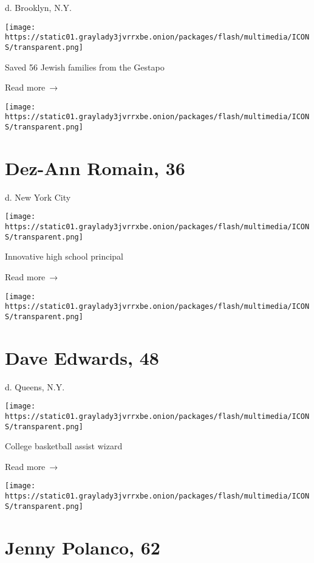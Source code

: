 d. Brooklyn, N.Y.

\texttt{[image: https://static01.graylady3jvrrxbe.onion/packages/flash/multimedia/ICONS/transparent.png]}

Saved 56 Jewish families from the Gestapo

 Read more~→

\href{https://www.nytimes3xbfgragh.onion/2020/03/27/obituaries/dez-ann-roman-dead-coronavirus.html}{}

\texttt{[image: https://static01.graylady3jvrrxbe.onion/packages/flash/multimedia/ICONS/transparent.png]}

\hypertarget{dez-ann-romain-36}{%
\section{Dez-Ann Romain, 36}\label{dez-ann-romain-36}}

d. New York City

\texttt{[image: https://static01.graylady3jvrrxbe.onion/packages/flash/multimedia/ICONS/transparent.png]}

Innovative high school principal

 Read more~→

\href{https://www.nytimes3xbfgragh.onion/2020/03/27/obituaries/dave-edwards-dead-coronavirus.html}{}

\texttt{[image: https://static01.graylady3jvrrxbe.onion/packages/flash/multimedia/ICONS/transparent.png]}

\hypertarget{dave-edwards-48}{%
\section{Dave Edwards, 48}\label{dave-edwards-48}}

d. Queens, N.Y.

\texttt{[image: https://static01.graylady3jvrrxbe.onion/packages/flash/multimedia/ICONS/transparent.png]}

College basketball assist wizard

 Read more~→

\href{https://www.nytimes3xbfgragh.onion/2020/03/27/obituaries/jenny-polanco-dead-coronavirus.html}{}

\texttt{[image: https://static01.graylady3jvrrxbe.onion/packages/flash/multimedia/ICONS/transparent.png]}

\hypertarget{jenny-polanco-62}{%
\section{Jenny Polanco, 62}\label{jenny-polanco-62}}


